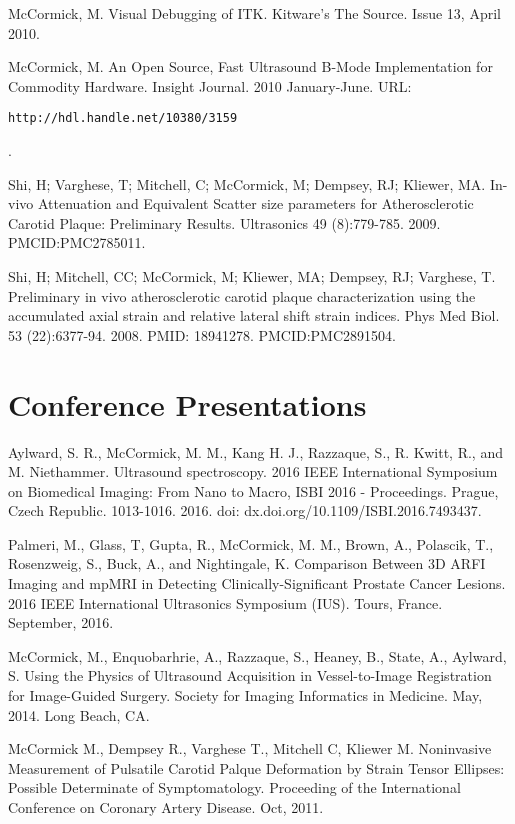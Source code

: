 \documentclass[margin,line]{res}
\begin{document}
\begin{resume}
McCormick, M.  Visual Debugging of ITK.  Kitware's The Source.  Issue 13, April
2010.

McCormick, M.  An Open Source, Fast Ultrasound B-Mode Implementation for
Commodity Hardware.  Insight Journal.  2010 January-June.
\vspace*{-.25in}
URL: \begin{verbatim}http://hdl.handle.net/10380/3159\end{verbatim}.
\vspace*{-.35in}

Shi, H; Varghese, T; Mitchell, C; McCormick, M; Dempsey, RJ; Kliewer, MA.
In-vivo Attenuation and Equivalent Scatter size parameters for Atherosclerotic
Carotid Plaque: Preliminary Results.  Ultrasonics 49 (8):779-785.  2009.
PMCID:PMC2785011.

Shi, H; Mitchell, CC; McCormick, M; Kliewer, MA; Dempsey, RJ; Varghese, T.
Preliminary in vivo atherosclerotic carotid plaque characterization
using the accumulated axial strain and relative lateral shift strain
indices.  Phys Med Biol. 53 (22):6377-94. 2008. PMID:
18941278.  PMCID:PMC2891504.

\section{\sc Conference Presentations}

Aylward, S. R., McCormick, M. M., Kang H. J., Razzaque, S., R. Kwitt,
R., and M. Niethammer. Ultrasound spectroscopy. 2016 IEEE International
Symposium on Biomedical Imaging: From Nano to Macro, ISBI 2016 - Proceedings.
Prague, Czech Republic. 1013-1016. 2016.
doi: dx.doi.org/10.1109/ISBI.2016.7493437.

Palmeri, M., Glass, T, Gupta, R., McCormick, M. M., Brown, A.,
Polascik, T., Rosenzweig, S., Buck, A., and Nightingale, K.
Comparison Between 3D ARFI Imaging and mpMRI in Detecting
Clinically-Significant Prostate Cancer Lesions.
2016 IEEE International Ultrasonics Symposium (IUS).
Tours, France. September, 2016.

McCormick, M., Enquobarhrie, A., Razzaque, S., Heaney, B., State, A., Aylward,
S. Using the Physics of Ultrasound Acquisition in Vessel-to-Image Registration
for Image-Guided Surgery.  Society for Imaging Informatics in Medicine.  May,
2014. Long Beach, CA.

McCormick M., Dempsey R., Varghese T., Mitchell C, Kliewer M.  Noninvasive
Measurement of Pulsatile Carotid Palque Deformation by Strain Tensor Ellipses:
Possible Determinate of Symptomatology.  Proceeding of the International
Conference on Coronary Artery Disease.  Oct, 2011.


\end{resume}
\end{document}
